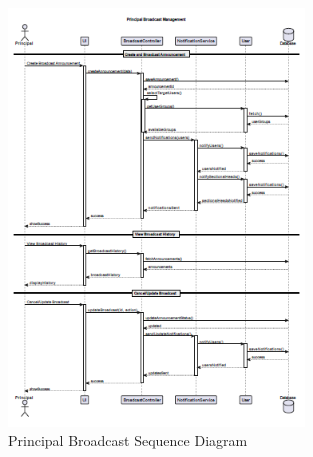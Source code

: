\documentclass[12pt,a4paper]{report}
\begin{document}
\begin{figure}[htbp]
    \centering
    \includegraphics[width=0.7\textwidth]{principal-broadcast-sequence.png}
    \caption{Principal Broadcast Sequence Diagram}
    \label{fig:principal-broadcast-sequence}
\end{figure}
\end{document}
